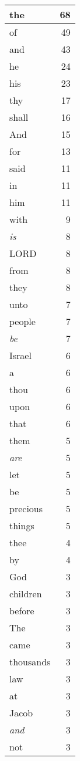 \begin{center}
\begin{longtable}{l|r}
\hline \hline
\endlastfoot
the & 68 \\ \hline
of & 49 \\ \hline
and & 43 \\ \hline
he & 24 \\ \hline
his & 23 \\ \hline
thy & 17 \\ \hline
shall & 16 \\ \hline
And & 15 \\ \hline
for & 13 \\ \hline
said & 11 \\ \hline
in & 11 \\ \hline
him & 11 \\ \hline
with & 9 \\ \hline
\emph{is} & 8 \\ \hline
LORD & 8 \\ \hline
from & 8 \\ \hline
they & 8 \\ \hline
unto & 7 \\ \hline
people & 7 \\ \hline
\emph{be} & 7 \\ \hline
Israel & 6 \\ \hline
a & 6 \\ \hline
thou & 6 \\ \hline
upon & 6 \\ \hline
that & 6 \\ \hline
them & 5 \\ \hline
\emph{are} & 5 \\ \hline
let & 5 \\ \hline
be & 5 \\ \hline
precious & 5 \\ \hline
things & 5 \\ \hline
thee & 4 \\ \hline
by & 4 \\ \hline
God & 3 \\ \hline
children & 3 \\ \hline
before & 3 \\ \hline
The & 3 \\ \hline
came & 3 \\ \hline
thousands & 3 \\ \hline
law & 3 \\ \hline
at & 3 \\ \hline
Jacob & 3 \\ \hline
\emph{and} & 3 \\ \hline
not & 3 \\ \hline

\end{longtable}
\end{center}
